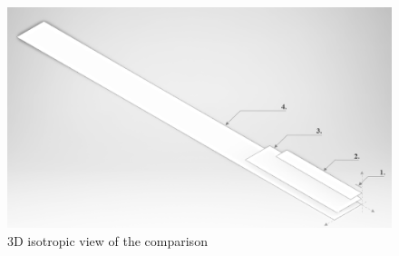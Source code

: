 \documentclass[11pt]{article}
\begin{document}
\begin{figure}
    \centering
    \includegraphics[width=\textwidth]{figures/iso-view.png}
    \caption{3D isotropic view of the comparison}
    \label{fig:3D-wings}
\end{figure}
\end{document}
